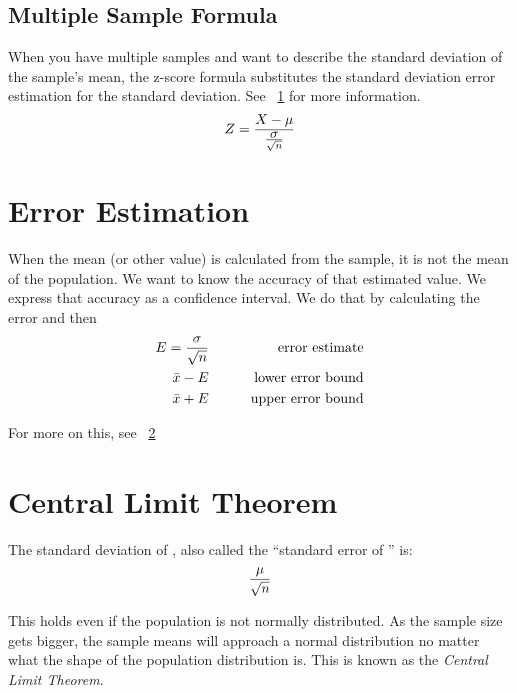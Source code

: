 	\subsection{Multiple Sample Formula}
When you have multiple samples and want to describe the standard deviation of the sample's mean, the z-score formula substitutes the standard deviation error estimation for the standard deviation.  See \sectionname~\ref{sec:errorestimation} for more information.
	\begin{equation}
		Z = \frac{X-\mbox{$\mu$}}{\frac{\mbox{$\sigma$}}{\sqrt{n}}	}
	\end{equation}

	\section{Error Estimation}
	\label{sec:errorestimation}
When the mean (or other value) is calculated from the sample, it is not the mean of the population.  We want to know the accuracy of that estimated value.  We express that accuracy as a confidence interval.  We do that by calculating the error and then
	\begin{eqnarray}
		E = \frac{\mbox{$\sigma$}}{\sqrt{n}}	& \quad\quad & \text{error estimate}	\\
		\mbox{$\bar{x}$} - E								& 		& \text{lower error bound}				\\
		\mbox{$\bar{x}$} + E								& 		& \text{upper error bound}
	\end{eqnarray}
	\begin{mathwhere}[0.38in]
	\end{mathwhere}
For more on this, see \sectionname~\ref{sec:centrallimittheorem}

	\section{Central Limit Theorem}
	\label{sec:centrallimittheorem}
The standard deviation of \samplemean{}, also called the ``standard error of \samplemean{}'' is:
	\begin{equation}
		\frac{\mbox{$\mu$}}{\sqrt{n}}
	\end{equation}
	\begin{mathwhere}
	\end{mathwhere}
This holds even if the population is not normally distributed.  As the sample size gets bigger, the sample means will approach a normal distribution no matter what the shape of the population distribution is.  This is known as the \textit{Central Limit Theorem}.


